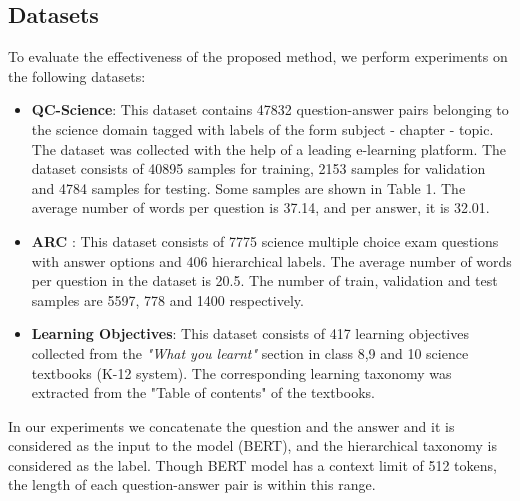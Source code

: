 \documentclass[runningheads, envcountsame, a4paper]{llncs}
\begin{document}
 \subsection{Datasets}
 To evaluate the effectiveness of the proposed method, we perform experiments on the following datasets:
 \let\labelitemi\labelitemii
 \begin{itemize}
     \item \textbf{QC-Science}: This dataset contains 47832 question-answer pairs belonging to the science domain tagged with labels of the form subject - chapter - topic. The dataset was collected with the help of a leading e-learning platform. The dataset consists of 40895 samples for training, 2153 samples for validation and 4784 samples for testing. Some samples are shown in Table 1. The average number of words per question is 37.14, and per answer, it is 32.01.
     \item \textbf{ARC} \cite{xumulti}: This dataset  consists of 7775 science multiple choice exam questions with answer options and 406 hierarchical labels. The average number of words per question in the dataset is 20.5. The number of train, validation and test samples are 5597, 778 and 1400 respectively.
     


     \item \textbf{Learning Objectives}: This dataset consists of 417 learning objectives collected from the \textit{"What you learnt"} section in class 8,9 and 10 science textbooks (K-12 system). The corresponding learning taxonomy was extracted from the "Table of contents" of the textbooks. 

 \end{itemize}

In our experiments we concatenate the question and the answer and it is considered as the input to the model (BERT), and the hierarchical taxonomy is considered as the label. Though BERT model has a context limit of 512 tokens, the length of each question-answer pair is within this range.
\end{document}
